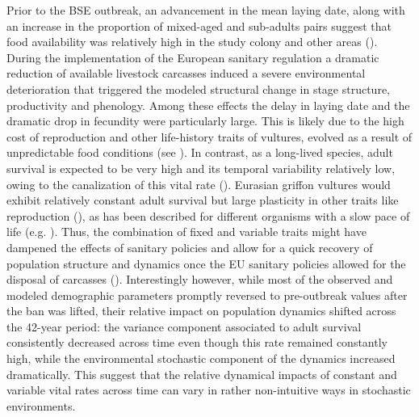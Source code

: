 \documentclass[12pt]{article}
\begin{document}
Prior to the BSE outbreak, an advancement in the mean laying date, along with an increase in the proportion of mixed-aged and sub-adults pairs suggest that food availability was relatively high in the study colony and other areas (\cite{Blanco1997,Blanco2014,Parra2004}). During the implementation of the European sanitary regulation a dramatic reduction of available livestock carcasses induced a severe environmental deterioration that triggered the modeled structural change in stage structure, productivity and phenology. Among these effects the delay in laying date and the dramatic drop in fecundity were particularly large. This is likely due to the high cost of reproduction and other life-history traits of vultures, evolved as a result of unpredictable food conditions (see \cite{Donazar1993,Bennett2002,Carrete2006}). In contrast, as a long-lived species, adult survival is expected to be very high and its temporal variability relatively low, owing to the canalization of this vital rate (\cite{Stearns1994,Saether2000,Pfister2002,Saether2013}). Eurasian griffon vultures would exhibit relatively constant adult survival but large plasticity in other traits like reproduction (\cite{Fargallo2018}), as has been described for different organisms with a slow pace of life (e.g. \cite{Bennett2002,Benton2006,Saether2013}). Thus, the combination of fixed and variable traits might have dampened the effects of sanitary policies and allow for a quick recovery of population structure and dynamics once the EU sanitary policies allowed for the disposal of carcasses (\cite{Margalida2010,Blanco2014}). Interestingly however, while most of the observed and modeled demographic parameters promptly reversed to pre-outbreak values after the ban was lifted, their relative impact on population dynamics shifted across the 42-year period: the variance component associated to adult survival consistently decreased across time even though this rate remained constantly high, while the environmental stochastic component of the dynamics increased dramatically. This suggest that the relative dynamical impacts of constant and variable vital rates across time can vary in rather non-intuitive ways in stochastic environments. \\
\end{document}
